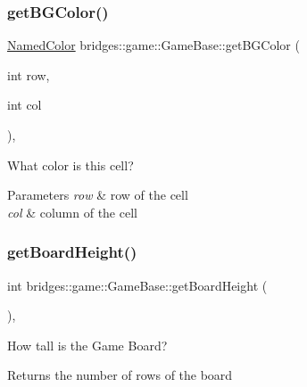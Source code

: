 \subsubsection{\texorpdfstring{getBGColor()}{getBGColor()}}
{\footnotesize\ttfamily \mbox{\hyperlink{namespacebridges_1_1game_afaa832a4322b25b6a4ebfba832f10f26}{Named\+Color}} bridges\+::game\+::\+Game\+Base\+::get\+B\+G\+Color (\begin{DoxyParamCaption}\item[{int}]{row,  }\item[{int}]{col }\end{DoxyParamCaption})\hspace{0.3cm}{\ttfamily [inline]}, {\ttfamily [protected]}}



What color is this cell? 


\begin{DoxyParams}{Parameters}
{\em row} & row of the cell \\
\hline
{\em col} & column of the cell \\
\hline
\end{DoxyParams}
\mbox{\label{classbridges_1_1game_1_1_game_base_a14510d6685e0b224c8995e397ad64adc}} 
\subsubsection{\texorpdfstring{getBoardHeight()}{getBoardHeight()}}
{\footnotesize\ttfamily int bridges\+::game\+::\+Game\+Base\+::get\+Board\+Height (\begin{DoxyParamCaption}{ }\end{DoxyParamCaption})\hspace{0.3cm}{\ttfamily [inline]}, {\ttfamily [protected]}}



How tall is the Game Board? 

\begin{DoxyReturn}{Returns}
the number of rows of the board 
\end{DoxyReturn}
\mbox{\label{classbridges_1_1game_1_1_game_base_ad74bf992cced25e9997fbf8a63bf8157}} 
